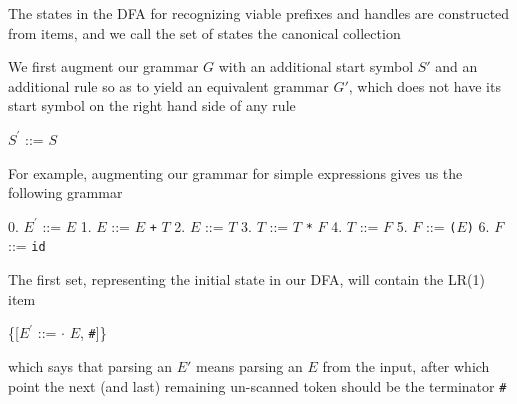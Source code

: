 \documentclass[8pt,a4paper,compress,handout]{beamer}
\newcommand{\mm}[1]{$#1$}
\newcommand{\expo}[2]{$#1^{#2}$}
\newenvironment{spaced}
{
\smallskip
\hspace{.5cm}
\begin{minipage}[c]{\textwidth}
}
{
\end{minipage}
\smallskip
}
\begin{document}
\begin{frame}[fragile]
\pause

The states in the DFA for recognizing viable prefixes and handles are constructed from items, and we call the set of states the canonical collection

\pause
\bigskip

We first augment our grammar $G$ with an additional start symbol $S'$ and an additional rule so as to yield an equivalent grammar $G'$, which does not have its start symbol on the right hand side of any rule

\text{ }
\begin{spaced}
\begin{production}
\expo{S}{\prime} ::= \mm{S}
\end{production}
\end{spaced}

\pause

For example, augmenting our grammar for simple expressions gives us the following grammar

\text{ }
\begin{spaced}
\begin{production}
0. \expo{E}{\prime} ::= \mm{E}
1. \mm{E}  ::= \mm{E} \lstinline{+} \mm{T}
2. \mm{E}  ::= \mm{T}
3. \mm{T}  ::= \mm{T} \lstinline{*} \mm{F}
4. \mm{T}  ::= \mm{F}
5. \mm{F}  ::= \lstinline{(}\mm{E}\lstinline{)}
6. \mm{F}  ::= \lstinline{id}
\end{production}
\end{spaced}

\pause

The first set, representing the initial state in our DFA, will contain the LR(1) item

\text{ }
\begin{spaced}
\begin{production}
\{[\expo{E}{\prime} ::= \mm{\cdot} \mm{E}, \lstinline{#}]\}
\end{production}
\end{spaced}

\noindent which says that parsing an $E'$ means parsing an $E$ from the input, after which point the next (and last) remaining un-scanned token should be the terminator \lstinline{#}
\end{frame}
\end{document}
